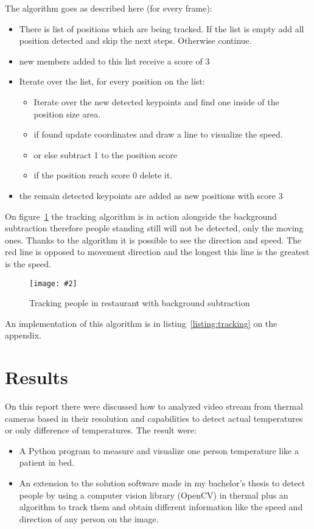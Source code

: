 \documentclass[hidelinks,11pt,a4paper,oneside,article]{memoir}
\newcommand{\putimage}[3][10] %
{
\begin{figure}[h]
    \centering
    \captionsetup{justification=centering}
    \texttt{[image: \#2]}
    \caption{#3}
    \label{fig:#2}
\end{figure}
}
\begin{document}
The algorithm goes as described here (for every frame):
\begin{itemize}
    \item There is list of positions which are being tracked. If the list is empty add all position detected and skip the next steps. Otherwise continue.
    \item new members added to this list receive a score of 3
    \item Iterate over the list, for every position on the list:
    \begin{itemize}[leftmargin=.5in]
        \item Iterate over the new detected keypoints and find one inside of the position size area.
        \item if found update coordinates and draw a line to visualize the speed.
        \item or else subtract 1 to the position score
        \item if the position reach score 0 delete it.
    \end{itemize}
    \item the remain detected keypoints are added as new positions with score 3
\end{itemize}

On figure~\ref{fig:tracking} the tracking algorithm is in action alongside the background subtraction therefore people standing still will not be detected, only the moving ones. Thanks to the algorithm it is possible to see the direction and speed. The red line is opposed to movement direction and the longest this line is the greatest is the speed.

    \putimage{tracking}{Tracking people in restaurant with background subtraction}

An implementation of this algorithm is in listing~\ref{listing:tracking} on the appendix.

\clearpage
\chapter{Results}
On this report there were discussed how to analyzed video stream from thermal cameras based in their resolution and capabilities to detect actual temperatures or only difference of temperatures. The result were:
\begin{itemize}
    \item  A Python program to measure and visualize one person temperature like a patient in bed.
    \item An extension to the solution software made in my bachelor's thesis to detect people by using a computer vision library (OpenCV) in thermal plus an algorithm to track them and obtain different information like the speed and direction of any person on the image.
\end{itemize}
\end{document}

